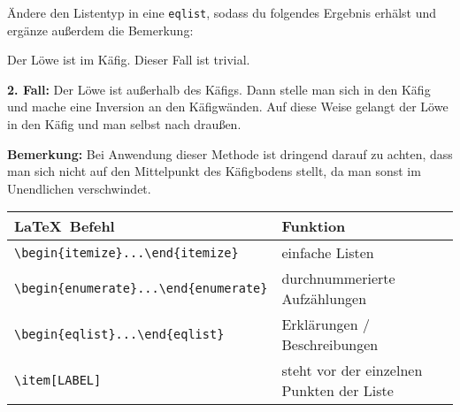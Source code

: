 \documentclass["WS\space 16-17\space -\space LaTeX-Kurs\space -\space Praesentation\space -\space 2.tex"]{subfiles}
\begin{document}
\begin{frame}[fragile]
	\Aufgabee
		Ändere den Listentyp in eine \lstinline[basicstyle=\normalfont\normalsize]|eqlist|, sodass du folgendes Ergebnis erhälst und ergänze außerdem die Bemerkung:
		\begin{outputbox}
			\vspace{-0.2cm}
			\begin{eqlist}
				\item[{\normalcolor\textbf{1. Fall:}}]
					Der Löwe ist im Käfig. Dieser Fall ist trivial.
				\item[{\normalcolor\textbf{2. Fall:}}]
					Der Löwe ist außerhalb des Käfigs. Dann stelle man sich in den Käfig und mache eine Inversion an den Käfigwänden. Auf diese Weise gelangt der Löwe in den Käfig und man selbst nach draußen.
			\end{eqlist}
			\vspace{-0.2cm}
			\textbf{Bemerkung:}
			Bei Anwendung dieser Methode ist dringend darauf zu achten, dass man sich nicht auf den Mittelpunkt des Käfigbodens stellt, da man sonst im Unendlichen verschwindet.
		\end{outputbox}
	\btVFill\Befehle
		\begin{center}
			\begin{tabular}{ll}
				\toprule
				\LaTeX\ Befehl										&	Funktion									\\ \midrule
				\lstinline|\begin{itemize}...\end{itemize}|			&	einfache Listen								\\
				\lstinline|\begin{enumerate}...\end{enumerate}|		&	durchnummerierte Aufzählungen				\\
				\lstinline|\begin{eqlist}...\end{eqlist}|			&	Erklärungen / Beschreibungen				\\
				\lstinline|\item[LABEL]|							&	steht vor der einzelnen Punkten der Liste	\\
				\bottomrule
			\end{tabular}
		\end{center}
	\vspace{0.1cm}
\end{frame}
\end{document}
